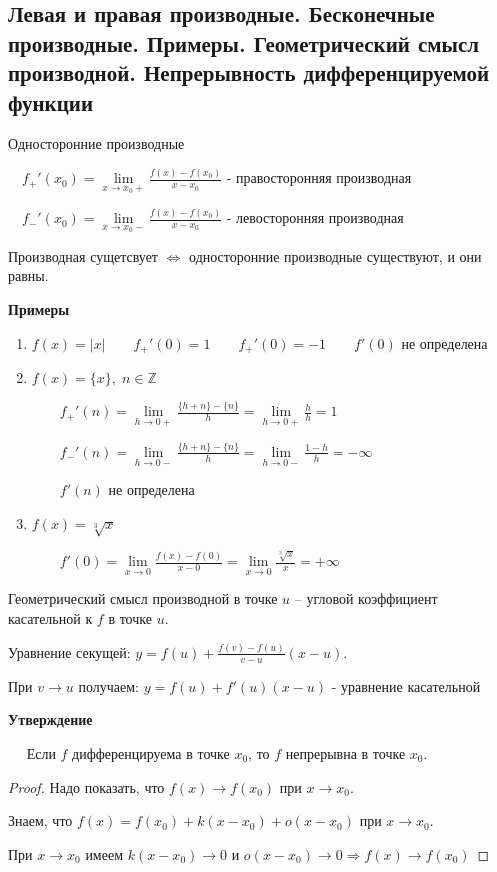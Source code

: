 \subsection{Левая и правая производные. Бесконечные производные. Примеры. Геометрический смысл производной. Непрерывность дифференцируемой функции \href{https://youtu.be/OXDjegAsmSU?t=1071}{\Walley}}
\begin{conj}
    Односторонние производные

    $\quad f_{+}'(x_0) = \lim\limits_{x \to x_0+} \frac{f(x) - f(x_0)}{x - x_0}$ - правосторонняя производная

    $\quad f_{-}'(x_0) = \lim\limits_{x \to x_0-} \frac{f(x) - f(x_0)}{x - x_0}$ - левосторонняя производная
\end{conj}
\begin{notice}
    Производная сущетсвует $\Leftrightarrow$ односторонние производные существуют, и они равны.
\end{notice}


\textbf{Примеры}
\begin{enumerate}
    \item $f(x) = |x| \quad\quad f_{+}'(0) = 1 \quad\quad f_{+}'(0) = -1 \quad\quad f'(0)$ не определена
    \item $f(x) = \{x\}, \; n \in \mathbb{Z}$
    
    $\quad\quad f_{+}'(n) = \lim\limits_{h \to 0+} \frac{\{h + n\} - \{n\}}{h} = \lim\limits_{h \to 0+} \frac{h}{h} = 1$

    $\quad\quad f_{-}'(n) = \lim\limits_{h \to 0-} \frac{\{h + n\} - \{n\}}{h} = \lim\limits_{h \to 0-} \frac{1 - h}{h} = -\infty$

    $\quad\quad f'(n)$ не определена
    \item  $f(x) = \sqrt[3]{x}$
    
    $\quad\quad f'(0) = \lim\limits_{x \to 0} \frac{f(x) - f(0)}{x - 0} = \lim\limits_{x \to 0} \frac{\sqrt[3]{x}}{x} = +\infty$
\end{enumerate}
\begin{conj}
    Геометрический смысл производной в точке $u$ -- угловой коэффициент касательной к $f$ в точке $u$.
\end{conj}
Уравнение секущей: $y = f(u) + \frac{f(v) - f(u)}{v - u}(x - u)$. 

При $v \to u$ получаем: $y = f(u) + f'(u)(x - u)$ - уравнение касательной


\textbf{Утверждение} 

$\quad$ Если $f$ дифференцируема в точке $x_0$, то $f$ непрерывна в точке $x_0$.
\begin{proof}
    Надо показать, что $f(x) \to f(x_0)$ при $x \to x_0$.  
    
    Знаем, что $f(x) = f(x_0) + k(x - x_0) + o(x - x_0)$ при $x \to x_0$. 

    При $x \to x_0$ имеем $k(x - x_0) \to 0$ и $o(x - x_0) \to 0 \Rightarrow f(x) \to f(x_0)$ 
\end{proof}
